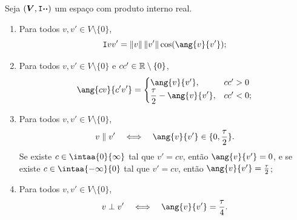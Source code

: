 \begin{prop}
Seja $(\bm V,\mathtt I{\bm{\cdot}}{\bm{\cdot}})$ um espaço com produto interno real.
	\begin{enumerate}
	\item Para todos $v,v' \in V \setminus \{0\}$,
		\begin{equation*}
		\inte{v}{v'} = \nor{v}\nor{v'}\cos(\ang{v}{v'});
		\end{equation*}
	\item  Para todos $v,v' \in V \setminus \{0\}$ e $cc' \in \mathbb{R} \setminus \{0\}$,
	\begin{equation*}
	\ang{cv}{c'v'} = \begin{cases}
		\ang{v}{v'},& cc'>0 \\
		\displaystyle\frac{\tau}{2} - \ang{v}{v'},& cc'<0;
	\end{cases}
	\end{equation*}
	
	\item Para todos $v,v' \in V \setminus \{0\}$,
	\begin{equation*}
	v \parallel v' \sse \ang{v}{v'} \in \{0,\frac{\tau}{2}\}.
	\end{equation*}
Se existe $c \in \intaa{0}{\infty}$ tal que $v' =cv$, então $\ang{v}{v'} = 0$, e se existe $c \in \intaa{-\infty}{0}$ tal que $v' =cv$, então $\ang{v}{v'} = \frac{\tau}{2}$;
	
	\item Para todos $v,v' \in V \setminus \{0\}$,
	\begin{equation*}
	v \perp  v' \sse \ang{v}{v'} = \frac{\tau}{4}.
	\end{equation*}
	\end{enumerate}
\end{prop}
